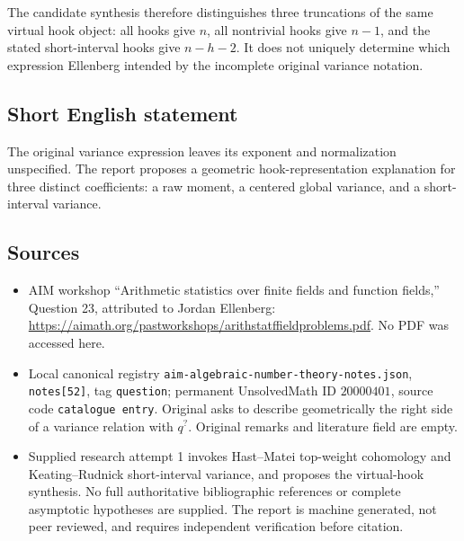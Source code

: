 \documentclass[11pt]{article}
\begin{document}
The candidate synthesis therefore distinguishes three truncations of the same virtual hook object: all hooks give \(n\), all nontrivial hooks give \(n-1\), and the stated short-interval hooks give \(n-h-2\). It does not uniquely determine which expression Ellenberg intended by the incomplete original variance notation.
\subsection{Short English statement}
The original variance expression leaves its exponent and normalization unspecified. The report proposes a geometric hook-representation explanation for three distinct coefficients: a raw moment, a centered global variance, and a short-interval variance.
\subsection{Sources}
\begin{itemize}
\item AIM workshop ``Arithmetic statistics over finite fields and function fields,'' Question 23, attributed to Jordan Ellenberg: \url{https://aimath.org/pastworkshops/arithstatffieldproblems.pdf}. No PDF was accessed here.
\item Local canonical registry \texttt{aim-algebraic-number-theory-notes.json}, \texttt{notes[52]}, tag \texttt{question}; permanent UnsolvedMath ID \(20000401\), source code \texttt{catalogue entry}. Original asks to describe geometrically the right side of a variance relation with \(q^{?}\). Original remarks and literature field are empty.
\item Supplied research attempt 1 invokes Hast--Matei top-weight cohomology and Keating--Rudnick short-interval variance, and proposes the virtual-hook synthesis. No full authoritative bibliographic references or complete asymptotic hypotheses are supplied. The report is machine generated, not peer reviewed, and requires independent verification before citation.
\end{itemize}
\end{document}
